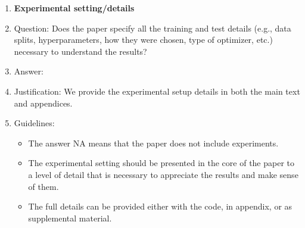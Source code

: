 \documentclass{article}
\begin{document}
\begin{enumerate}
\item {\bf Experimental setting/details}
    \item[] Question: Does the paper specify all the training and test details (e.g., data splits, hyperparameters, how they were chosen, type of optimizer, etc.) necessary to understand the results?
    \item[] Answer: \answerYes{} %
    \item[] Justification: We provide the experimental setup details in both the main text and appendices.
    \item[] Guidelines:
    \begin{itemize}
        \item The answer NA means that the paper does not include experiments.
        \item The experimental setting should be presented in the core of the paper to a level of detail that is necessary to appreciate the results and make sense of them.
        \item The full details can be provided either with the code, in appendix, or as supplemental material.
    \end{itemize}


\end{enumerate}
\end{document}
